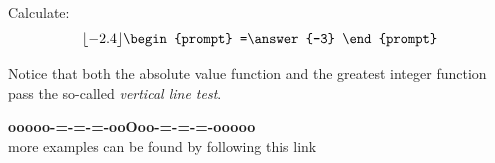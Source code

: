 \documentclass{ximera}
\begin{document}
  \begin{question} 
  
  
  Calculate:
  \[
  \lfloor -2.4 \rfloor
  \begin{prompt}
    =\answer{-3}
  \end{prompt}
  \]
\end{question}





Notice that both the absolute value function and the greatest integer function pass the so-called \textit{vertical line test}.


















\begin{onlineOnly}
\begin{center}
\textbf{\textcolor{green!50!black}{ooooo-=-=-=-ooOoo-=-=-=-ooooo}} \\

more examples can be found by following this link\\ 

\end{center}
\end{onlineOnly}
\end{document}
